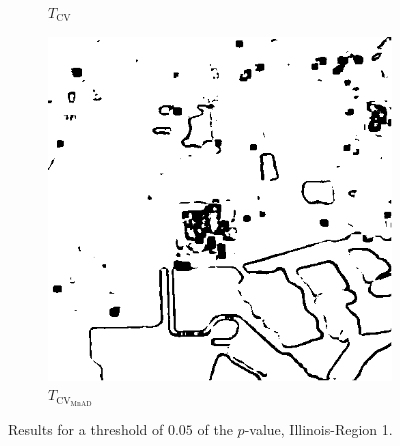 \documentclass[aspectratio=1610,10pt]{beamer}
\begin{document}
\begin{frame}
\begin{figure}[H]
\begin{subfigure}[b]{0.3\textwidth}
    \caption{$T_\text{CV}$}
    \label{fig:lake_0.05-2}
  \end{subfigure}
  \hfill
  \begin{subfigure}[b]{0.3\textwidth}
    \centering
    \includegraphics[width=\textwidth]{../../Figures/PNG/mnad_005_lake_512}
     \caption{$T_{\text{CV}_{\text{MnAD}}}$}
    \label{fig:lake_0.05-3}
  \end{subfigure}
  \caption{Results for a threshold of $0.05$ of the $p$-value, Illinois-Region 1. }
  \label{fig:lake_0.05}
\end{figure}
\end{frame} 
\end{document}
